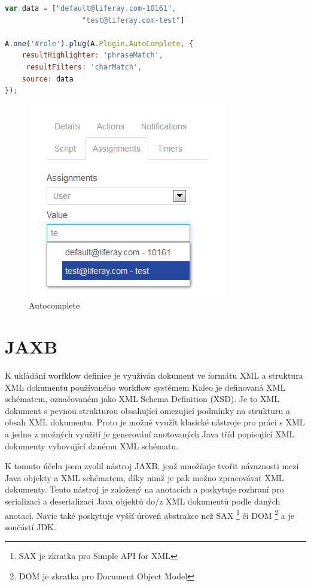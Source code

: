 \documentclass{fithesis}
\begin{document}
\begin{lstlisting}[language=JavaScript, float =h , caption = Použítí komponenty autocomplete , label = code:autocomplete ]
var data = ["default@liferay.com-10161", 
                  "test@liferay.com-test"]

A.one('#role').plug(A.Plugin.AutoComplete, {
	resultHighlighter: 'phraseMatch', 
     resultFilters: 'charMatch',
	source: data
});
\end{lstlisting}



\begin{figure}[htp]
\centering
\includegraphics{images/autocomplete.png}
\caption{Autocomplete}
\label{fig:autocomplete}
\end{figure}


\section{JAXB}
K ukládání worfklow definice je využíván dokument ve formátu XML a struktura XML dokumentu používaného workflow systémem Kaleo je definovaná XML schématem, označovaném jako XML Schema Definition (XSD). Je to XML dokument s pevnou strukturou obsahující omezujicí podmínky na strukturu a obsah XML dokumentu. Proto je možné využít klasické nástroje pro práci s XML a jedno z možných využití je generování anotovaných Java tříd popisující XML dokumenty vyhovující danému XML schématu. 

K tomuto účelu jsem zvolil nástroj JAXB, jenž umožňuje tvořit návaznosti mezi Java objekty a XML schématem, díky nimž je pak možno zpracovávat XML dokumenty. Tento nástroj je založený na anotacích a poskytuje rozhraní pro serializaci a deserializaci Java objektů do/z XML dokumentů podle daných anotací. Navíc také poskytuje vyšší úroveň abstrakce než SAX \footnote{SAX je zkratka pro Simple API for XML} či DOM \footnote{DOM je zkratka pro Document Object Model} a je součástí JDK.
\end{document}
